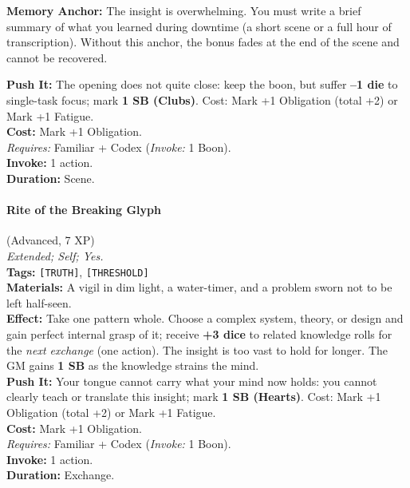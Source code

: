\noindent\textbf{Memory Anchor:} The insight is overwhelming. You must write a brief summary of what you learned during downtime (a short scene or a full hour of transcription). Without this anchor, the bonus fades at the end of the scene and cannot be recovered.

\textbf{Push It:} The opening does not quite close: keep the boon, but suffer \textbf{--1 die} to single-task focus; mark \textbf{1 SB (Clubs)}. Cost: Mark +1 Obligation (total +2) or Mark +1 Fatigue. \\
\textbf{Cost:} Mark +1 Obligation. \\
\textit{Requires:} Familiar + Codex (\textit{Invoke:} 1 Boon). \\
\textbf{Invoke:} 1 action. \\
\textbf{Duration:} Scene.

\paragraph{Rite of the Breaking Glyph} (Advanced, 7 XP) \hfill \\
\emph{Extended; Self; Yes.} \\
\textbf{Tags:} \texttt{[TRUTH]}, \texttt{[THRESHOLD]} \\
\textbf{Materials:} A vigil in dim light, a water-timer, and a problem sworn not to be left half-seen. \\
\textbf{Effect:} Take one pattern whole. Choose a complex system, theory, or design and gain perfect internal grasp of it; receive \textbf{+3 dice} to related knowledge rolls for the \textit{next exchange} (one action). The insight is too vast to hold for longer. The GM gains \textbf{1 SB} as the knowledge strains the mind. \\
\textbf{Push It:} Your tongue cannot carry what your mind now holds: you cannot clearly teach or translate this insight; mark \textbf{1 SB (Hearts)}. Cost: Mark +1 Obligation (total +2) or Mark +1 Fatigue. \\
\textbf{Cost:} Mark +1 Obligation. \\
\textit{Requires:} Familiar + Codex (\textit{Invoke:} 1 Boon). \\
\textbf{Invoke:} 1 action. \\
\textbf{Duration:} Exchange.

